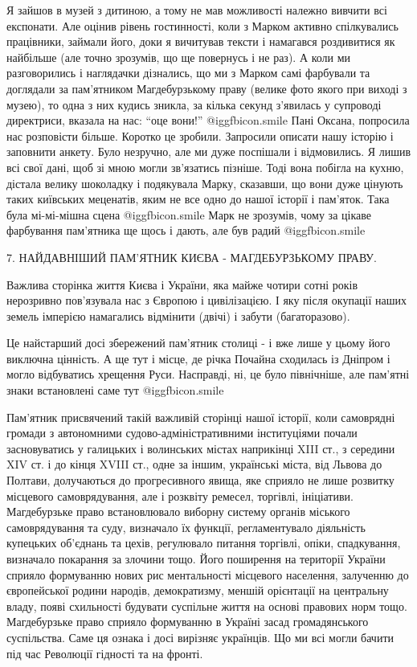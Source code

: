 Я зайшов в музей з дитиною, а тому не мав можливості належно вивчити всі
експонати. Але оцінив рівень гостинності, коли з Марком активно спілкувались
працівники, займали його, доки я вичитував тексти і намагався роздивитися як
найбільше (але точно зрозумів, що ще повернусь і не раз). А коли ми
разговорились і наглядачки дізнались, що ми з Марком самі фарбували та
доглядали за пам’ятником Магдебурзькому праву (велике фото якого при виході з
музею), то одна з них кудись зникла, за кілька секунд з’явилась у супроводі
директриси, вказала на нас: \enquote{оце вони!}  @igg{fbicon.smile}  Пані Оксана, попросила нас
розповісти більше. Коротко це зробили. Запросили описати нашу історію і
заповнити анкету. Було незручно, але ми дуже поспішали і відмовились. Я лишив
всі свої дані, щоб зі мною могли зв’язатись пізніше. Тоді вона побігла на
кухню, дістала велику шоколадку і подякувала Марку, сказавши, що вони дуже
цінують таких київських меценатів, яким не все одно до нашої історії і
пам’яток. Така була мі-мі-мішна сцена  @igg{fbicon.smile}  Марк не зрозумів, чому за цікаве
фарбування пам’ятника ще щось і дають, але був радий  @igg{fbicon.smile}  


7. НАЙДАВНІШИЙ ПАМ'ЯТНИК КИЄВА - МАГДЕБУРЗЬКОМУ ПРАВУ. 

Важлива сторінка життя Києва і України, яка майже чотири сотні років нерозривно
пов’язувала нас з Європою і цивілізацією. І яку після окупації наших земель
імперією намагались відмінити (двічі) і забути (багаторазово). 

Це найстарший досі збережений пам’ятник столиці - і вже лише у цьому його
виключна цінність. А ще тут і місце, де річка Почайна сходилась із Дніпром і
могло відбуватись хрещення Руси. Насправді, ні, це було північніше, але
пам’ятні знаки встановлені саме тут  @igg{fbicon.smile}   

Пам’ятник присвячений такій важливій сторінці нашої історії, коли самоврядні
громади з автономними судово-адміністративними інституціями почали
засновуватись у галицьких і волинських містах наприкінці XIII ст., з середини
XIV ст. і до кінця XVIII ст., одне за іншим, українські міста, від Львова до
Полтави, долучаються до прогресивного явища, яке сприяло не лише розвитку
місцевого самоврядування, але і розквіту ремесел, торгівлі, ініціативи.
Магдебурзьке право встановлювало виборну систему органів міського
самоврядування та суду, визначало їх функції, регламентувало діяльність
купецьких об'єднань та цехів, регулювало питання торгівлі, опіки, спадкування,
визначало покарання за злочини тощо. Його поширення на території України
сприяло формуванню нових рис ментальності місцевого населення, залученню до
європейської родини народів, демократизму, меншій орієнтації на центральну
владу, появі схильності будувати суспільне життя на основі правових норм тощо.
Магдебурзьке право сприяло формуванню в Україні засад громадянського
суспільства. Саме ця ознака і досі вирізняє українців. Що ми всі могли бачити
під час Революції гідності та на фронті.

